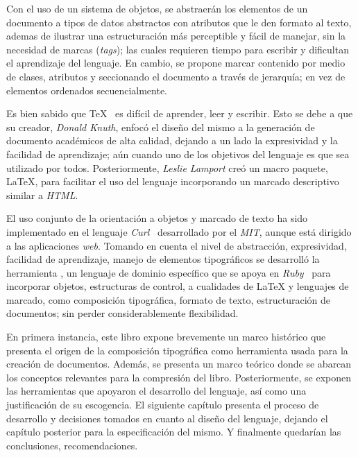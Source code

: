 \documentclass[12pt,letterpaper,titlepage,oneside,openright]{book}
\newcommand{\OhTeX}{%
    \makebox[0.76em][c]{O}%
    \makebox[0.25em][c]{%
        \raisebox{0.14em}[0em][0em]{%
            \fontsize{0.5em}{0cm}%
                \selectfont H%
        }%
    }%
    \makebox[1.35em][c]{\TeX}%
}
\newcommand{\latex}{\LaTeX\xspace}
\newcommand{\tex}{\TeX\xspace}
\newcommand{\ohtex}{\OhTeX\xspace}
\newcommand{\ruby}{\textit{Ruby}\xspace}
\begin{document}
Con el uso de un sistema de objetos, se abstraerán los elementos de un documento a
tipos de datos abstractos con atributos que le den formato al texto, ademas de
ilustrar una estructuración más perceptible y fácil de manejar, sin la necesidad de
marcas (\textit{tags}); las cuales requieren tiempo para escribir y dificultan el
aprendizaje del lenguaje. En cambio, se propone marcar contenido por medio de clases,
atributos y seccionando el documento a través de jerarquía; en vez de elementos
ordenados secuencialmente.

Es bien sabido que \tex~\cite{webtexhp} es difícil de aprender, leer y escribir. Esto
se debe a que su creador, \textit{Donald Knuth}, enfocó el diseño del mismo a la
generación de documento académicos de alta calidad, dejando a un lado la expresividad
y la facilidad de aprendizaje; aún cuando uno de los objetivos del lenguaje es que
sea utilizado por todos. Posteriormente, \textit{Leslie Lamport} creó un macro
paquete, \latex, para facilitar el uso del lenguaje incorporando un marcado
descriptivo similar a \textit{HTML}.

El uso conjunto de la orientación a objetos y marcado de texto ha sido implementado
en el lenguaje \textit{Curl}~\cite{webcurlhp} desarrollado por el \textit{MIT},
aunque está dirigido a las aplicaciones \textit{web}. Tomando en cuenta el nivel de
abstracción, expresividad, facilidad de aprendizaje, manejo de elementos tipográficos
se desarrolló la herramienta \ohtex, un lenguaje de dominio específico que se apoya
en \ruby~\cite{webrubyhp} para incorporar objetos, estructuras de control, a
cualidades de \latex y lenguajes de marcado, como composición tipográfica, formato de
texto, estructuración de documentos; sin perder considerablemente flexibilidad.

En primera instancia, este libro expone brevemente un marco histórico que presenta el
origen de la composición tipográfica como herramienta usada para la creación de
documentos. Además, se presenta un marco teórico donde se abarcan los conceptos
relevantes para la compresión del libro. Posteriormente, se exponen las herramientas
que apoyaron el desarrollo del lenguaje, así como una justificación de su escogencia.
El siguiente capítulo presenta el proceso de desarrollo y decisiones tomados en
cuanto al diseño del lenguaje, dejando el capítulo posterior para la especificación
del mismo. Y finalmente quedarían las conclusiones, recomendaciones.
\end{document}

